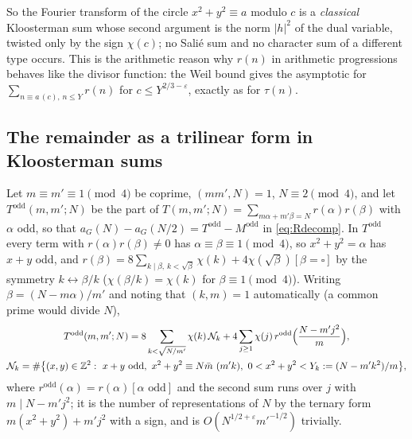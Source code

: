 \documentclass[11pt,a4paper]{article}
\theoremstyle{remark}
\theoremstyle{definition}
\newcommand{\Z}{\mathbb Z}
\newcommand{\e}{\varepsilon}
\begin{document}
So the Fourier transform of the circle $x^2+y^2\equiv a$ modulo $c$ is a \emph{classical} Kloosterman sum whose second argument is the norm $|h|^2$ of the dual variable, twisted only by the sign $\chi(c)$; no Sali\'e sum and no character sum of a different type occurs. This is the arithmetic reason why $r(n)$ in arithmetic progressions behaves like the divisor function: the Weil bound gives the asymptotic for $\sum_{n\equiv a\,(c),\,n\le Y}r(n)$ for $c\le Y^{2/3-\e}$, exactly as for $\tau(n)$.

\subsection{The remainder as a trilinear form in Kloosterman sums}
Let $m\equiv m'\equiv1\pmod4$ be coprime, $(mm',N)=1$, $N\equiv2\pmod4$, and let $T^{\mathrm{odd}}(m,m';N)$ be the part of $T(m,m';N)=\sum_{m\alpha+m'\beta=N}r(\alpha)r(\beta)$ with $\alpha$ odd, so that $a_G(N)-a_G(N/2)=T^{\mathrm{odd}}-M^{\mathrm{odd}}$ in \eqref{eq:Rdecomp}. In $T^{\mathrm{odd}}$ every term with $r(\alpha)r(\beta)\ne0$ has $\alpha\equiv\beta\equiv1\pmod4$, so $x^2+y^2=\alpha$ has $x+y$ odd, and $r(\beta)=8\sum_{k\mid\beta,\,k<\sqrt\beta}\chi(k)+4\chi(\sqrt\beta)[\beta=\square]$ by the symmetry $k\leftrightarrow\beta/k$ ($\chi(\beta/k)=\chi(k)$ for $\beta\equiv1\pmod 4$). Writing $\beta=(N-m\alpha)/m'$ and noting that $(k,m)=1$ automatically (a common prime would divide $N$),
\begin{gather}
T^{\mathrm{odd}}(m,m';N)=8\sum_{k<\sqrt{N/m'}}\chi(k)\,\mathcal N_k+4\sum_{j\ge1}\chi(j)\,r^{\mathrm{odd}}\Bigl(\frac{N-m'j^2}{m}\Bigr),\label{eq:Todd}\\
\mathcal N_k=\#\bigl\{(x,y)\in\Z^2:\ x+y\text{ odd},\ x^2+y^2\equiv N\bar m\ (m'k),\ 0<x^2+y^2<Y_k:=(N-m'k^2)/m\bigr\},\notag
\end{gather}
where $r^{\mathrm{odd}}(\alpha)=r(\alpha)[\alpha\text{ odd}]$ and the second sum runs over $j$ with $m\mid N-m'j^2$; it is the number of representations of $N$ by the ternary form $m(x^2+y^2)+m'j^2$ with a sign, and is $O(N^{1/2+\e}m'^{-1/2})$ trivially.
\end{document}
